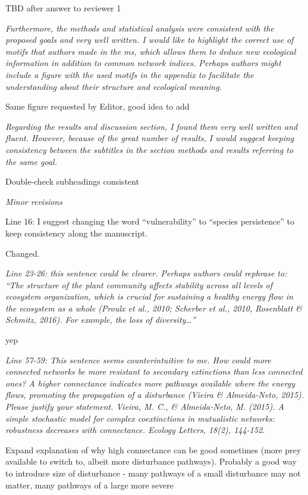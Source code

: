 \documentclass[12pt]{article}
\newcommand{\us}{\rm \setlength{\leftskip}{0.3cm} \setlength{\rightskip}{0.3cm}}
\newcommand{\them}{\it \setlength{\leftskip}{0cm} \setlength{\rightskip}{0cm}}
\begin{document}
\us TBD after answer to reviewer 1

\them
Furthermore, the methods and statistical analysis were consistent with the proposed goals and very well written. I would like to highlight the correct use of motifs that authors made in the ms, which allows them to deduce new ecological information in addition to common network indices. Perhaps authors might include a figure with the used motifs in the appendix to facilitate the understanding about their structure and ecological meaning. 

\us Same figure requested by Editor, good idea to add

\them
Regarding the results and discussion section, I found them very well written and fluent. However, because of the great number of results, I would suggest keeping consistency between the subtitles in the section methods and results referring to the same goal.

\us Double-check subheadings consistent

\them
Minor revisions

Line 16: I suggest changing the word “vulnerability” to “species persistence” to keep consistency along the manuscript.

\us
Changed.

\them
Line 23-26: this sentence could be clearer. Perhaps authors could rephrase to: “The structure of the plant community affects stability across all levels of ecosystem organization, which is crucial for sustaining a healthy energy flow in the ecosystem as a whole (Proulx et al., 2010; Scherber et al., 2010, Rosenblatt & Schmitz, 2016). For example, the loss of diversity…”

\us yep

\them
Line 57-59: This sentence seems counterintuitive to me. How could more connected networks be more resistant to secondary extinctions than less connected ones? A higher connectance indicates more pathways available where the energy flows, promoting the propagation of a disturbance (Vieira \& Almeida-Neto, 2015). Please justify your statement.
Vieira, M. C., \& Almeida‐Neto, M. (2015). A simple stochastic model for complex coextinctions in mutualistic networks: robustness decreases with connectance. Ecology Letters, 18(2), 144-152.

\us Expand explanation of why high connectance can be good sometimes (more prey available to switch to, albeit more disturbance pathways). Probably a good way to introduce size of disturbance - many pathways of a small disturbance may not matter, many pathways of a large more severe
\end{document}
